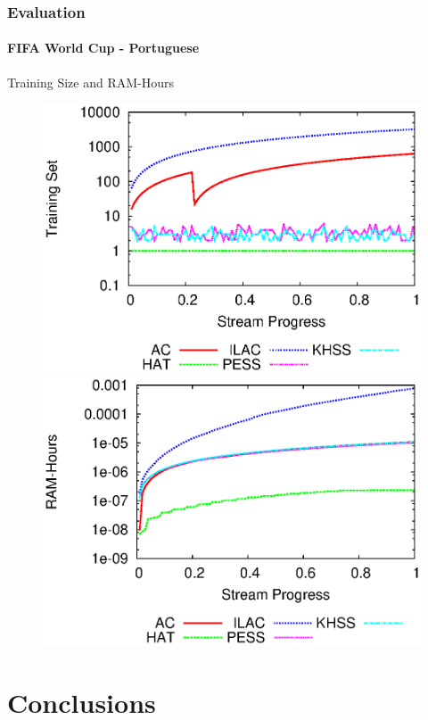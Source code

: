 \documentclass[14pt]{beamer}
\begin{document}
\begin{frame}
\frametitle{Evaluation}
\framesubtitle{FIFA World Cup - Portuguese}
Training Size and RAM-Hours
\begin{figure}[htp!]
\label{fig:fm_2}
\centering
\includegraphics[scale=0.41]{pt_window.eps}
\includegraphics[scale=0.41]{pt_ramhours.eps}
\end{figure}
\end{frame}

\section{Conclusions}
\end{document}
